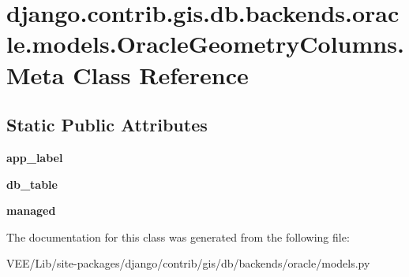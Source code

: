 \hypertarget{classdjango_1_1contrib_1_1gis_1_1db_1_1backends_1_1oracle_1_1models_1_1_oracle_geometry_columns_1_1_meta}{}\section{django.\+contrib.\+gis.\+db.\+backends.\+oracle.\+models.\+Oracle\+Geometry\+Columns.\+Meta Class Reference}
\label{classdjango_1_1contrib_1_1gis_1_1db_1_1backends_1_1oracle_1_1models_1_1_oracle_geometry_columns_1_1_meta}
\subsection*{Static Public Attributes}
\begin{DoxyCompactItemize}
\item 
\mbox{\label{classdjango_1_1contrib_1_1gis_1_1db_1_1backends_1_1oracle_1_1models_1_1_oracle_geometry_columns_1_1_meta_a7834dc0af772ab489a3ccb37df53d904}} 
{\bfseries app\+\_\+label}
\item 
\mbox{\label{classdjango_1_1contrib_1_1gis_1_1db_1_1backends_1_1oracle_1_1models_1_1_oracle_geometry_columns_1_1_meta_abd695e402dbf303f17fa86915f7b7d69}} 
{\bfseries db\+\_\+table}
\item 
\mbox{\label{classdjango_1_1contrib_1_1gis_1_1db_1_1backends_1_1oracle_1_1models_1_1_oracle_geometry_columns_1_1_meta_a5a39cc9769fb1a460d511305eadea436}} 
{\bfseries managed}
\end{DoxyCompactItemize}


The documentation for this class was generated from the following file\+:\begin{DoxyCompactItemize}
\item 
V\+E\+E/\+Lib/site-\/packages/django/contrib/gis/db/backends/oracle/models.\+py\end{DoxyCompactItemize}
